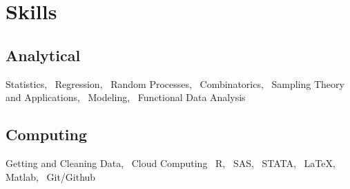 \documentclass[]{deedy-resume-openfont}
\begin{document}
\section{Skills}
\begin{minipage}[t]{.6\textwidth}
\subsection{Analytical}
Statistics, \, Regression, \, Random Processes, \, Combinatorics, \, Sampling Theory and Applications, \, Modeling,  \, Functional Data Analysis
\sectionsep
\end{minipage}
\hfill
\begin{minipage}[t]{.35\textwidth}
\subsection{Computing}
Getting and Cleaning Data, \, Cloud Computing \, R, \, SAS, \, STATA, \, \LaTeX, \, Matlab, \,  Git/Github
\end{minipage}
\end{document}
